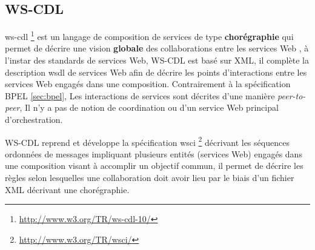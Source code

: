 
    \subsection{WS-CDL}
    \label{sec:WS-CDL}
    \acrshort{ws-cdl} \footnote{\url{http://www.w3.org/TR/ws-cdl-10/}}
    \cite{kavantzas2005web} est un langage de composition de services
    de type \textbf{chorégraphie} qui permet de décrire une vision
    \textbf{globale} des collaborations entre les services Web
    \cite{elie2010}, à l'instar des standards de services Web,
    \textsc{WS-CDL} est basé sur \textsc{XML}, il complète la
    description \acrshort{wsdl} de services Web afin de décrire les
    points d'interactions entre les services Web engagés dans une
    composition. Contrairement à la spécification \textsc{BPEL}
    \ref{sec:bpel}, Les interactions de services sont décrites d'une
    manière \textit{peer-to-peer}, Il n'y a pas de notion de
    coordination ou d'un service Web principal d'orchestration.

    \textsc{WS-CDL} reprend et développe la spécification
    \acrshort{wsci} \footnote{\url{http://www.w3.org/TR/wsci/}}
    \cite{arkin2002web} décrivant les séquences ordonnées de messages
    impliquant plusieurs entités (services Web) engagés dans une
    composition visant à accomplir un objectif commun, il permet de
    décrire les règles selon lesquelles une collaboration doit avoir
    lieu par le biais d'un fichier \textsc{XML} décrivant une
    chorégraphie.


